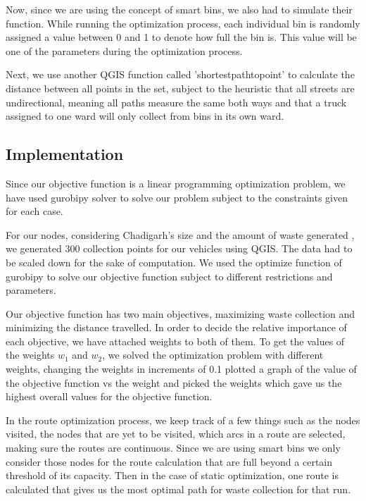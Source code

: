 \documentclass[12pt]{article}
\begin{document}
Now, since we are using the concept of smart bins, we also had to simulate their function. While running the optimization process, each individual bin is randomly assigned a value between 0 and 1 to denote how full the bin is. This value will be one of the parameters during the optimization process.

Next, we use another QGIS function called 'shortestpathtopoint' to calculate the distance between all points in the set, subject to the heuristic that all streets are undirectional, meaning all paths measure the same both ways and that a truck assigned to one ward will only collect from bins in its own ward.

\subsection{Implementation}

Since our objective function is a linear programming optimization problem, we have used gurobipy solver to solve our problem subject to the constraints given for each case.

For our nodes, considering Chadigarh's size and the amount of waste generated \cite{ravindra2015system}, we generated 300 collection points for our vehicles using QGIS. The data had to be scaled down for the sake of computation. We used the optimize function of gurobipy to solve our objective function subject to different restrictions and parameters.

Our objective function has two main objectives, maximizing waste collection and minimizing the distance travelled. In order to decide the relative importance of each objective, we have attached weights to both of them. To get the values of the weights $w_1$ and $w_2$, we solved the optimization problem with different weights, changing the weights in increments of 0.1 plotted a graph of the value of the objective function vs the weight and picked the weights which gave us the highest overall values for the objective function.       

In the route optimization process, we keep track of a few things such as the nodes visited, the nodes that are yet to be visited, which arcs in a route are selected, making sure the routes are continuous. Since we are using smart bins we only consider those nodes for the route calculation that are full beyond a certain threshold of its capacity. Then in the case of static optimization, one route is calculated that gives us the most optimal path for waste collection for that run.
\end{document}
